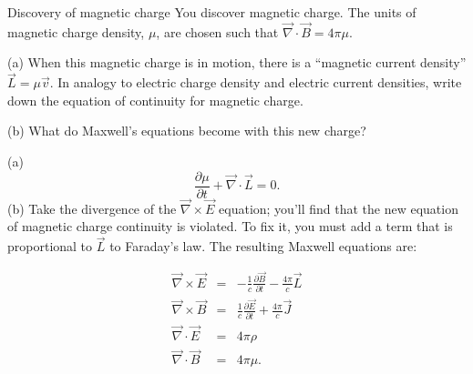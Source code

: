 \documentclass[makesolutionspdf]{esg8022pset}
\begin{document}
\begin{problem}{Discovery of magnetic charge}
You discover magnetic
charge.  The units of magnetic charge density,
$\mu$, are chosen such that $\vec\nabla\cdot\vec B = 4\pi\mu$.

\par\noindent (a) When this magnetic charge is in motion,
there is a ``magnetic current density'' $\vec L = \mu \vec v$.  In
analogy to electric charge density and electric current densities,
write down the equation of continuity for magnetic charge.

\par\noindent (b) What do Maxwell's equations become with this
new charge?
\end{problem}

\begin{solution}
(a) \begin{equation}
\frac{\partial \mu}{\partial t}+\vec{\nabla}\cdot\vec{L}=0.
\end{equation}
(b) Take the divergence of the $\vec\nabla\times\vec E$ equation; you'll
find that the new equation of magnetic charge continuity is violated.
To fix it, you must add a term that is proportional to $\vec L$ to
Faraday's law.  The resulting Maxwell equations are:

\begin{eqnarray}
\vec{\nabla}\times\vec{E} &=& -\frac{1}{c}\frac{\partial
\vec{B}}{\partial t}-\frac{4\pi}{c}\vec{L}\\
\vec{\nabla}\times\vec{B} &=& \frac{1}{c}\frac{\partial
\vec{E}}{\partial t}+\frac{4\pi}{c}\vec{J}\\
\vec{\nabla}\cdot\vec{E} &=& 4\pi\rho\\
\vec{\nabla}\cdot\vec{B} &=& 4\pi\mu.
\end{eqnarray}




\end{solution}
\end{document}
